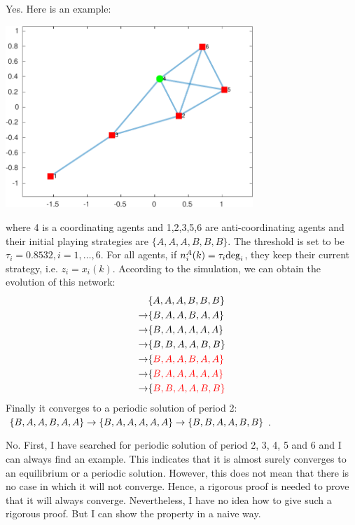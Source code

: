 \documentclass[a4 paper, 12pt]{article}
\begin{document}
 Yes. Here is an example:
\begin{center}
        \includegraphics[width = 0.7\textwidth]{pd3.pdf}
\end{center}
where 4 is a coordinating agents and 1,2,3,5,6 are anti-coordinating agents and their initial playing strategies are $\{A,A,A,B,B,B\}$. The threshold is set to be $\tau_i = 0.8532, i = 1,\dots,6$. For all agents, if $n_i^A(k)=\tau_i\textnormal{deg}_i$, they keep their current strategy, i.e. $z_i = x_i(k)$. According to the simulation, we can obtain the evolution of this network:
\begin{equation*}
        \begin{aligned}
                &\{A,A,A,B,B,B\} \\
                \rightarrow &\{B,A,A,B,A,A\} \\ 
                \rightarrow &\{B,A,A,A,A,A\} \\
                \rightarrow &\{B,B,A,A,B,B\} \\
                \rightarrow &\{\color{red}B,A,A,B,A,A\} \\
                \rightarrow &\{\color{red}B,A,A,A,A,A\} \\
                \rightarrow &\{\color{red}B,B,A,A,B,B\} \\
        \end{aligned}
\end{equation*}
Finally it converges to a periodic solution of period 2: $\{B,A,A,B,A,A\}\rightarrow\{B,A,A,A,A,A\}\rightarrow\{B,B,A,A,B,B\}$.

 No. First, I have searched for periodic solution of period 2, 3, 4, 5 and 6 and I can always find an example. This indicates that it is almost surely converges to an equilibrium or a periodic solution. However, this does not mean that there is no case in which it will not converge. Hence, a rigorous proof is needed to prove that it will always converge. Nevertheless, I have no idea how to give such a rigorous proof. But I can show the property in a naive way.
\end{document}
